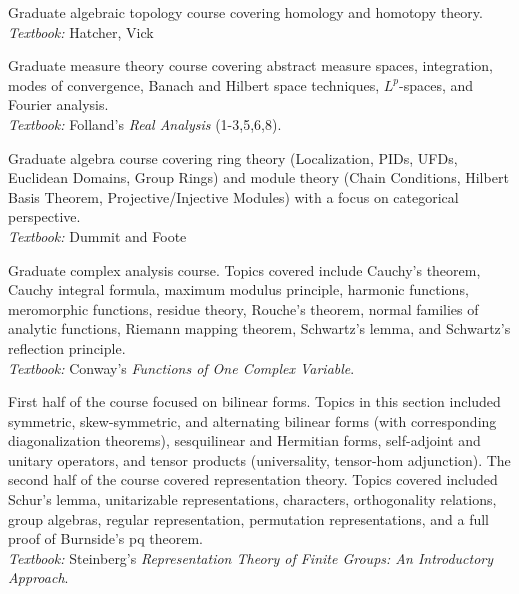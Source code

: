 \documentclass[11pt,letterpaper,sans]{moderncv}
\begin{document}
%
  {Graduate algebraic topology course covering homology and homotopy theory.  \\ \emph{Textbook: }Hatcher, Vick}

%
  {Graduate measure theory course covering abstract measure spaces, integration, modes of convergence, Banach and Hilbert space techniques, $L^p$-spaces, and Fourier analysis. \\ \emph{Textbook: }Folland's \emph{Real Analysis} (1-3,5,6,8).}

%
  {Graduate algebra course covering ring theory (Localization, PIDs, UFDs, Euclidean Domains, Group Rings) and module theory (Chain Conditions, Hilbert Basis Theorem, Projective/Injective Modules) with a focus on categorical perspective.   \\ \emph{Textbook: }Dummit and Foote}

%
  {Graduate complex analysis course. Topics covered include Cauchy’s theorem, Cauchy integral formula, maximum modulus principle, harmonic functions, meromorphic functions, residue theory, Rouche's theorem, normal families of analytic functions, Riemann mapping theorem, Schwartz's lemma, and Schwartz's reflection principle. \\ \emph{Textbook: }Conway's \emph{Functions of One Complex Variable}.}

%
  {First half of the course focused on bilinear forms. Topics in this section included symmetric, skew-symmetric, and alternating bilinear forms (with corresponding diagonalization theorems), sesquilinear and Hermitian forms, self-adjoint and unitary operators, and tensor products (universality, tensor-hom adjunction). The second half of the course covered representation theory. Topics covered included Schur's lemma, unitarizable representations, characters, orthogonality relations, group algebras, regular representation, permutation representations, and a full proof of Burnside's pq theorem. \\ \emph{Textbook: }Steinberg's \emph{Representation Theory of Finite Groups: An Introductory Approach}.}

\end{document}
